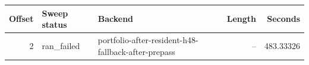 {\small
\begin{tabular}{rllrr}
\hline
Offset & Sweep status & Backend & Length & Seconds \\
\hline
2 & ran_failed & portfolio-after-resident-h48-fallback-after-prepass & -- & 483.33326 \\
\hline
\end{tabular}
}
